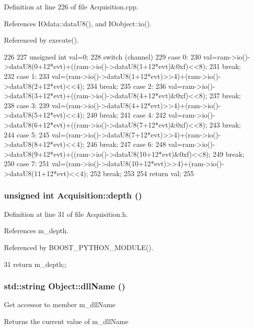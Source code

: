 Definition at line 226 of file Acquisition.cpp.

References IOdata::dataU8(), and IOobject::io().

Referenced by execute().


\begin{DoxyCode}
226                                                                                  
            {
227   unsigned int val=0;
228   switch (channel) {
229   case 0: 
230     val=ram->io()->dataU8(0+12*evt)+((ram->io()->dataU8(1+12*evt)&0xf)<<8);
231     break; 
232   case 1:
233     val=(ram->io()->dataU8(1+12*evt)>>4)+(ram->io()->dataU8(2+12*evt)<<4);
234     break;
235   case 2:
236     val=ram->io()->dataU8(3+12*evt)+((ram->io()->dataU8(4+12*evt)&0xf)<<8);
237     break;
238   case 3:
239     val=(ram->io()->dataU8(4+12*evt)>>4)+(ram->io()->dataU8(5+12*evt)<<4);
240     break;
241   case 4:
242     val=ram->io()->dataU8(6+12*evt)+((ram->io()->dataU8(7+12*evt)&0xf)<<8);
243     break;
244   case 5:
245     val=(ram->io()->dataU8(7+12*evt)>>4)+(ram->io()->dataU8(8+12*evt)<<4); 
246     break;
247   case 6:
248     val=ram->io()->dataU8(9+12*evt)+((ram->io()->dataU8(10+12*evt)&0xf)<<8); 
249     break;
250   case 7:
251     val=(ram->io()->dataU8(10+12*evt)>>4)+(ram->io()->dataU8(11+12*evt)<<4);
252     break;
253   }
254   return val;
255 }
\end{DoxyCode}
\hypertarget{classAcquisition_a1ad973e21a067c0de0b6264d0eb5182b}{
\subsubsection[{depth}]{\setlength{\rightskip}{0pt plus 5cm}unsigned int Acquisition::depth ()}}
\label{classAcquisition_a1ad973e21a067c0de0b6264d0eb5182b}


Definition at line 31 of file Acquisition.h.

References m\_\-depth.

Referenced by BOOST\_\-PYTHON\_\-MODULE().


\begin{DoxyCode}
31 {return m_depth;};
\end{DoxyCode}
\hypertarget{classObject_a2e3947f2870094c332d7454117f3ec63}{
\subsubsection[{dllName}]{\setlength{\rightskip}{0pt plus 5cm}std::string Object::dllName ()}}
\label{classObject_a2e3947f2870094c332d7454117f3ec63}
Get accessor to member m\_\-dllName \begin{DoxyReturn}{Returns}
the current value of m\_\-dllName 
\end{DoxyReturn}


